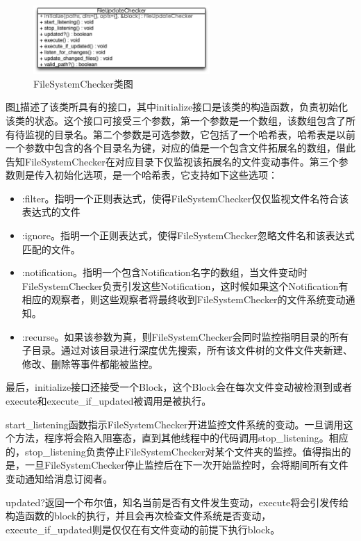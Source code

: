\begin{figure}[h]
\centering
\includegraphics[width=0.6\textwidth]{images/overview/file_update_checker_class.eps}
\caption{FileSystemChecker类图}
\label{fig-fuc-class}
\end{figure}

图\ref{fig-fuc-class}描述了该类所具有的接口，其中initialize接口是该类的构造函数，负责初始化该类的状态。这个接口可接受三个参数，第一个参数是一个数组，该数组包含了所有待监视的目录名。第二个参数是可选参数，它包括了一个哈希表，哈希表是以前一个参数中包含的各个目录名为键，对应的值是一个包含文件拓展名的数组，借此告知FileSystemChecker在对应目录下仅监视该拓展名的文件变动事件。第三个参数则是传入初始化选项，是一个哈希表，它支持如下这些选项：

\begin{itemize}
\item :filter。指明一个正则表达式，使得FileSystemChecker仅仅监视文件名符合该表达式的文件
\item :ignore。指明一个正则表达式，使得FileSystemChecker忽略文件名和该表达式匹配的文件。
\item :notification。指明一个包含Notification名字的数组，当文件变动时FileSystemChecker负责引发这些Notification，这时候如果这个Notification有相应的观察者，则这些观察者将最终收到FileSystemChecker的文件系统变动通知。
\item :recurse。如果该参数为真，则FileSystemChecker会同时监控指明目录的所有子目录。通过对该目录进行深度优先搜索，所有该文件树的文件文件夹新建、修改、删除等事件都能被监控。
\end{itemize}

最后，initialize接口还接受一个Block，这个Block会在每次文件变动被检测到或者execute和execute\_if\_updated被调用是被执行。

start\_listening函数指示FileSystemChecker开进监控文件系统的变动。一旦调用这个方法，程序将会陷入阻塞态，直到其他线程中的代码调用stop\_listening。相应的，stop\_listening负责停止FileSystemChecker对某个文件夹的监控。值得指出的是，一旦FileSystemChecker停止监控后在下一次开始监控时，会将期间所有文件变动通知给消息订阅者。

updated?返回一个布尔值，知名当前是否有文件发生变动，execute将会引发传给构造函数的block的执行，并且会再次检查文件系统是否变动，execute\_if\_updated则是仅仅在有文件变动的前提下执行block。

